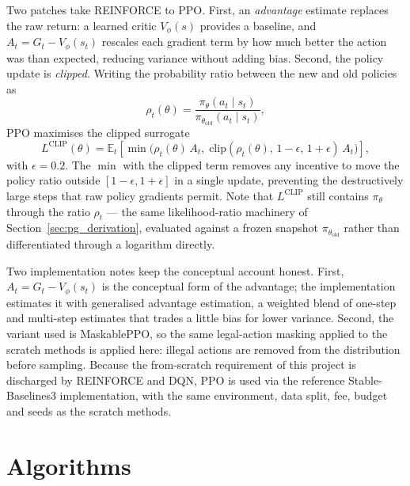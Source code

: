 Two patches take REINFORCE to PPO. First, an \emph{advantage} estimate
replaces the raw return: a learned critic $V_\phi(s)$ provides a baseline,
and $A_t = G_t - V_\phi(s_t)$ rescales each gradient term by how much
better the action was than expected, reducing variance without adding
bias. Second, the policy update is \emph{clipped}. Writing the
probability ratio between the new and old policies as
\begin{equation}
\rho_t(\theta) = \frac{\pi_\theta(a_t \mid s_t)}{\pi_{\theta_{\mathrm{old}}}(a_t \mid s_t)},
\end{equation}
PPO maximises the clipped surrogate
\begin{equation}
L^{\mathrm{CLIP}}(\theta) = \mathbb{E}_t\!\left[
  \min\bigl( \rho_t(\theta)\, A_t,\;
  \mathrm{clip}(\rho_t(\theta),\, 1-\epsilon,\, 1+\epsilon)\, A_t \bigr)
\right],
\label{eq:ppo_clip}
\end{equation}
with $\epsilon = 0.2$. The $\min$ with the clipped term removes any
incentive to move the policy ratio outside $[1-\epsilon, 1+\epsilon]$ in
a single update, preventing the destructively large steps that raw policy
gradients permit. Note that $L^{\mathrm{CLIP}}$ still contains
$\pi_\theta$ through the ratio $\rho_t$ --- the same likelihood-ratio
machinery of Section~\ref{sec:pg_derivation}, evaluated against a frozen
snapshot $\pi_{\theta_{\mathrm{old}}}$ rather than differentiated through
a logarithm directly.

Two implementation notes keep the conceptual account honest. First,
$A_t = G_t - V_\phi(s_t)$ is the conceptual form of the advantage; the
implementation estimates it with generalised advantage estimation, a
weighted blend of one-step and multi-step estimates that trades a little
bias for lower variance. Second, the variant used is MaskablePPO, so the
same legal-action masking applied to the scratch methods is applied here:
illegal actions are removed from the distribution before sampling.
Because the from-scratch requirement of this project is discharged by
REINFORCE and DQN, PPO is used via the reference Stable-Baselines3
implementation, with the same environment, data split, fee, budget and
seeds as the scratch methods.

\section{Algorithms}
\label{sec:algorithms}

